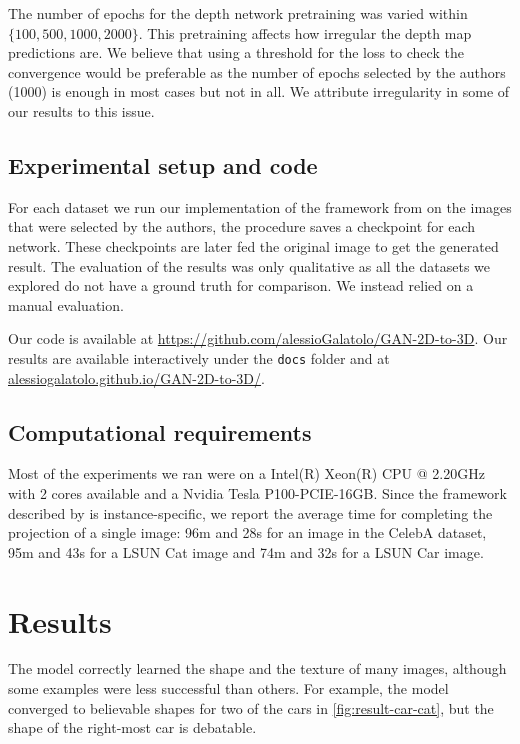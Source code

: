 The number of epochs for the depth network pretraining was varied within $\{100,\allowbreak 500,\allowbreak 1000,\allowbreak 2000\}$. This pretraining affects how irregular the depth map predictions are. We believe that using a threshold for the loss to check the convergence would be preferable as the number of epochs selected by the authors (1000) is enough in most cases but not in all. We attribute irregularity in some of our results to this issue.
\subsection{Experimental setup and code}
For each dataset we run our implementation of the framework from \textcite{gan2shape} on the images that were selected by the authors, the procedure saves a checkpoint for each network. These checkpoints are later fed the original image to get the generated result. The evaluation of the results was only qualitative as all the datasets we explored do not have a ground truth for comparison. We instead relied on a manual evaluation.

Our code is available at \url{https://github.com/alessioGalatolo/GAN-2D-to-3D}. Our results are available interactively under the \lstinline{docs} folder and at \href{https://alessiogalatolo.github.io/GAN-2D-to-3D/}{alessiogalatolo.github.io/GAN-2D-to-3D/}.
\subsection{Computational requirements}
Most of the experiments we ran were on a Intel(R) Xeon(R) CPU @ 2.20GHz with 2 cores available and a Nvidia Tesla P100-PCIE-16GB. Since the framework described by \textcite{gan2shape} is instance-specific, we report the average time for completing the projection of a single image: 96m and 28s for an image in the CelebA dataset, 95m and 43s for a LSUN Cat image and 74m and 32s for a LSUN Car image.
\section{Results}
\label{sec:results}
The model correctly learned the shape and the texture of many images, although some examples were less successful than others. For example, the model converged to believable shapes for two of the cars in \autoref{fig:result-car-cat}, but the shape of the right-most car is debatable. 

